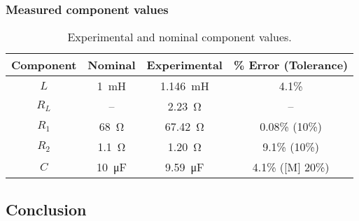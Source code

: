 \documentclass{report}
\begin{document}
\subsubsection{Measured component values}
\begin{table}[h]
	\centering
	\caption{Experimental and nominal component values.}
	\label{table:lab2components}
	\begin{threeparttable}
		\begin{tabular}{cccc}
			\toprule
			Component & Nominal & Experimental & \% Error (Tolerance) \\
			\midrule
			$L$  & \SI{1}{\milli\henry} & \SI{1.146}{\milli\henry} & 4.1\%  \\
			$R_L$ & -- & \SI{2.23}{\ohm} & -- \\
			$R_1$ & \SI{68}{\ohm} & \SI{67.42}{\ohm} & 0.08\% (10\%) \\
			$R_2$ & \SI{1.1}{\ohm} & \SI{1.20}{\ohm} & 9.1\% (10\%) \\
			$C$ & \SI{10}{\micro\farad} & \SI{9.59}{\micro\farad} & 4.1\% ([M] 20\%) \\
			\bottomrule
		\end{tabular}
	\end{threeparttable}
\end{table}

\subsection{Conclusion}
\end{document}
